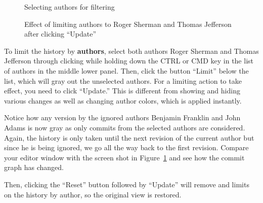 
\begin{figure}
\centering
  \begin{minipage}[t]{0.35\linewidth}
  \centering
  \caption{Selecting authors for filtering} \label{fig:editor-select-authors}
  \end{minipage}%
\hspace{0.04\linewidth}%
  \begin{minipage}[t]{0.61\linewidth}
  \centering
  \caption{Effect of limiting authors to Roger Sherman and Thomas Jefferson after clicking ``Update''} \label{fig:editor-limit-authors}
  \end{minipage}  
\end{figure}
To limit the history by \textbf{authors}, select both authors Roger Sherman and Thomas Jefferson through clicking while holding down the CTRL or CMD key in the list of authors in the middle lower panel.  Then, click the button ``Limit'' below the list, which will gray out the unselected authors.  For a limiting action to take effect, you need to click ``Update.''  This is different from showing and hiding various changes as well as changing author colors, which is applied instantly.

Notice how any version by the ignored authors Benjamin Franklin and John Adams is now gray as only commits from the selected authors are considered.  Again, the history is only taken until the next revision of the current author but since he is being ignored, we go all the way back to the first revision. Compare your editor window with the screen shot in Figure~\ref{fig:editor-limit-authors} and see how the commit graph has changed.

Then, clicking the ``Reset'' button followed by ``Update'' will remove and limits on the history by author, so the original view is restored.


